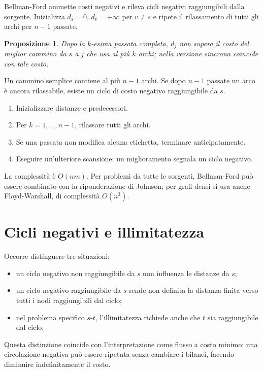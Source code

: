 \documentclass[11pt,a4paper]{article}
\newtheorem{proposition}[definition]{Proposizione}
\begin{document}
Bellman-Ford ammette costi negativi e rileva cicli negativi raggiungibili dalla sorgente. Inizializza $d_s=0$, $d_v=+\infty$ per $v\neq s$ e ripete il rilassamento di tutti gli archi per $n-1$ passate.

\begin{proposition}
Dopo la $k$-esima passata completa, $d_j$ non supera il costo del miglior cammino da $s$ a $j$ che usa al più $k$ archi; nella versione sincrona coincide con tale costo.
\end{proposition}

Un cammino semplice contiene al più $n-1$ archi. Se dopo $n-1$ passate un arco è ancora rilassabile, esiste un ciclo di costo negativo raggiungibile da $s$.

\begin{enumerate}
\item Inizializzare distanze e predecessori.
\item Per $k=1,\ldots,n-1$, rilassare tutti gli archi.
\item Se una passata non modifica alcuna etichetta, terminare anticipatamente.
\item Eseguire un'ulteriore scansione: un miglioramento segnala un ciclo negativo.
\end{enumerate}

La complessità è $O(nm)$. Per problemi da tutte le sorgenti, Bellman-Ford può essere combinato con la riponderazione di Johnson; per grafi densi si usa anche Floyd-Warshall, di complessità $O(n^3)$.

\section{Cicli negativi e illimitatezza}

Occorre distinguere tre situazioni:
\begin{itemize}
\item un ciclo negativo non raggiungibile da $s$ non influenza le distanze da $s$;
\item un ciclo negativo raggiungibile da $s$ rende non definita la distanza finita verso tutti i nodi raggiungibili dal ciclo;
\item nel problema specifico $s$-$t$, l'illimitatezza richiede anche che $t$ sia raggiungibile dal ciclo.
\end{itemize}

Questa distinzione coincide con l'interpretazione come flusso a costo minimo: una circolazione negativa può essere ripetuta senza cambiare i bilanci, facendo diminuire indefinitamente il costo.
\end{document}
